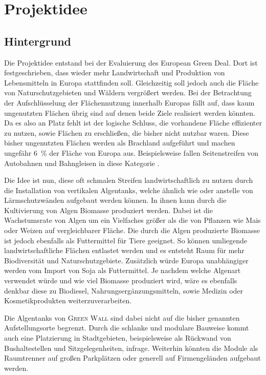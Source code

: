 \chapter{Projektidee}

\section{Hintergrund}

Die Projektidee entstand bei der Evaluierung des European Green Deal.
Dort ist festgeschrieben, dass wieder mehr Landwirtschaft und Produktion von Lebensmitteln in Europa stattfinden soll.
Gleichzeitig soll jedoch auch die Fläche von Naturschutzgebieten und Wäldern vergrößert werden.
Bei der Betrachtung der Aufschlüsselung der Flächennutzung innerhalb Europas fällt auf, dass kaum ungenutzten Flächen übrig sind auf denen beide Ziele realisiert werden könnten.
Da es also an Platz fehlt ist der logische Schluss, die vorhandene Fläche effizienter zu nutzen, sowie Flächen zu erschließen, die bisher nicht nutzbar waren.
Diese bisher ungenutzten Flächen werden als Brachland aufgeführt und machen ungefähr \qty{6}{\percent} der Fläche von Europa aus.
Beispielsweise fallen Seitenstreifen von Autobahnen und Bahngleisen in diese Kategorie \cite{Legislation2019.DerEuropaeischeGrueneDeal,Legislation2020.EUBiodiversitaetsstrategieFuer2030,Online.DieGemeinsameAgrarpolitikAufEinenBlick}.\par\medskip
%
Die Idee ist nun, diese oft schmalen Streifen landwirtschaftlich zu nutzen durch die Installation von vertikalen Algentanks, welche ähnlich wie oder anstelle von Lärmschutzwänden aufgebaut werden können.
In ihnen kann durch die Kultivierung von Algen Biomasse produziert werden.
Dabei ist die Wachstumsrate von Algen um ein Vielfaches größer als die von Pflanzen wie Mais oder Weizen auf vergleichbarer Fläche.
Die durch die Algen produzierte Biomasse ist jedoch ebenfalls als Futtermittel für Tiere geeignet.
So können umliegende landwirtschaftliche Flächen entlastet werden und es entsteht Raum für mehr Biodiversität und Naturschutzgebiete.
Zusätzlich würde Europa unabhängiger werden vom Import von Soja als Futtermittel.
Je nachdem welche Algenart verwendet würde und wie viel Biomasse produziert wird, wäre es ebenfalls denkbar diese zu Biodiesel, Nahrungsergänzungsmitteln, sowie Medizin oder Kosmetikprodukten weiterzuverarbeiten.\par\medskip

Die Algentanks von \textsc{Green Wall} sind dabei nicht auf die bisher genannten Aufstellungsorte begrenzt.
Durch die schlanke und modulare Bauweise kommt auch eine Platzierung in Stadtgebieten, beispielsweise als Rückwand von Bushaltestellen und Sitzgelegenheiten, infrage.
Weiterhin könnten die Module als Raumtrenner auf großen Parkplätzen oder generell auf Firmengeländen aufgebaut werden.\par\medskip

